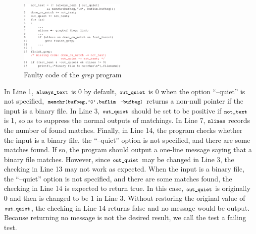 \documentclass{sig-alternate}
\newcommand{\CodeIn}[1]{{\small\texttt{#1}}}
\begin{document}
\begin{figure}[t]
\begin{center}
  \includegraphics[width=0.46\textwidth]{figs/example11.eps}
  \centering
  \caption{Faulty code of the \emph{grep} program}
  \label{fig:example1}
\end{center} %
\end{figure}



In Line 1, $\CodeIn{always\_text}$ is 0 by default,
$\CodeIn{out\_quiet}$ is 0 when the option ``--quiet'' is not
specified, $\CodeIn{memchr(bufbeg,'\\0',buflim}$ $\CodeIn{-bufbeg)}$
returns a non-null pointer if the input is a binary file. In Line 3,
$\CodeIn{out\_quiet}$ should be set to be positive if
$\CodeIn{not\_text}$ is 1, so as to suppress the normal outputs of
matchings. In Line 7, $\CodeIn{nlines}$ records the number of found
matches. Finally, in Line 14, the program checks whether the input
is a binary file, the ``--quiet'' option is not specified, and there
are some matches found. If so, the program should output a one-line
message saying that a binary file matches. However, since
$\CodeIn{out\_quiet}$ may be changed in Line 3, the checking in Line
13 may not work as expected. When the input is a binary file, the
``--quiet'' option is not specified, and there are some matches
found, the checking in Line 14 is expected to return true. In this
case, $\CodeIn{out\_quiet}$ is originally 0 and then is changed to
be 1 in Line 3. Without restoring the original value of
$\CodeIn{out\_quiet}$, the checking in Line 14 returns false and no
message would be output. Because returning no message is not the
desired result, we call the test a failing test.
\end{document}
